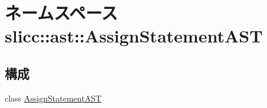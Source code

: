 \hypertarget{namespaceslicc_1_1ast_1_1AssignStatementAST}{
\section{ネームスペース slicc::ast::AssignStatementAST}
\label{namespaceslicc_1_1ast_1_1AssignStatementAST}
}
\subsection*{構成}
\begin{DoxyCompactItemize}
\item 
class \hyperlink{classslicc_1_1ast_1_1AssignStatementAST_1_1AssignStatementAST}{AssignStatementAST}
\end{DoxyCompactItemize}
